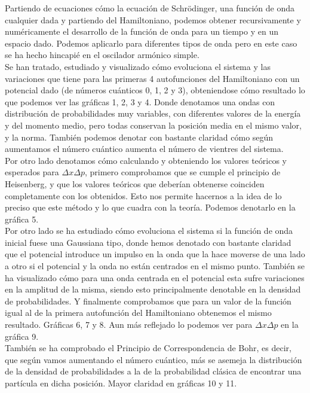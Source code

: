 \documentclass[12pt,paper]{article}
\begin{document}
Partiendo de ecuaciones cómo la ecuación de Schrödinger, una función de onda cualquier dada y partiendo del Hamiltoniano, podemos obtener recursivamente y numéricamente el desarrollo de la función de onda para un tiempo y en un espacio dado. Podemos aplicarlo para diferentes tipos de onda pero en este caso se ha hecho hincapié en el oscilador armónico simple.\\
Se han tratado, estudiado y visualizado cómo evoluciona el sistema y las variaciones que tiene para las primeras 4 autofunciones del Hamiltoniano con un potencial dado (de números cuánticos 0, 1, 2 y 3), obteniendose cómo resultado lo que podemos ver las gráficas 1, 2, 3 y 4. Donde denotamos una ondas con distribución de probabilidades muy variables, con diferentes valores de la energía y del momento medio, pero todas conservan la posición media en el mismo valor, y la norma. También podemos denotar con bastante claridad cómo según aumentamos el número cuántico aumenta el número de vientres del sistema.\\
Por otro lado denotamos cómo calculando y obteniendo los valores teóricos y esperados para $\Delta x \Delta p$, primero comprobamos que se cumple el principio de Heisenberg, y que los valores teóricos que deberían obtenerse coinciden completamente con los obtenidos. Esto nos permite hacernos a la idea de lo preciso que este método y lo que cuadra con la teoría. Podemos denotarlo en la gráfica 5.\\

Por otro lado se ha estudiado cómo evoluciona el sistema si la función de onda inicial fuese una Gaussiana tipo, donde hemos denotado con bastante claridad que el potencial introduce un impulso en la onda que la hace moverse de una lado a otro si el potencial y la onda no están centrados en el mismo punto. También se ha visualizado cómo para una onda centrada en el potencial esta sufre variaciones en la amplitud de la misma, siendo esto principalmente denotable en la densidad de probabilidades. Y finalmente comprobamos que para un valor de la función igual al de la primera autofunción del Hamiltoniano obtenemos el mismo resultado. Gráficas 6, 7 y 8. Aun más reflejado lo podemos ver para $\Delta x \Delta p$ en la gráfica 9.\\

También se ha comprobado el Principio de Correspondencia de Bohr, es decir, que según vamos aumentando el número cuántico, más se asemeja la distribución de la densidad de probabilidades a la de la probabilidad clásica de encontrar una partícula en dicha posición. Mayor claridad en gráficas 10 y 11.\\
\end{document}
